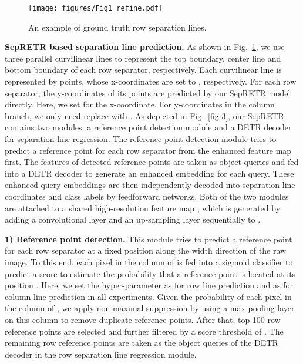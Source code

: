 \documentclass[sigconf]{acmart}
\begin{document}
\begin{figure}
  \centering
  \texttt{[image: figures/Fig1\_refine.pdf]}
  \caption{ An example of ground truth row separation lines.
  }
\label{fig-1}
\end{figure}

\textbf{SepRETR based separation line prediction.} As shown in Fig.~\ref{fig-1}, we use three parallel curvilinear lines to represent the top boundary, center line and bottom boundary of each row separator, respectively. Each curvilinear line is represented by  points, whose x-coordinates are set to , respectively. For each row separator, the y-coordinates of its  points are predicted by our SepRETR model directly. Here, we set  for the  x-coordinate. For y-coordinates in the column branch, we only need replace  with . As depicted in Fig.~\ref{fig-3}, our SepRETR contains two modules: a reference point detection module and a DETR decoder for separation line regression. The reference point detection module tries to predict a reference point for each row separator from the enhanced feature map  first. The features of detected reference points are taken as object queries and fed into a DETR decoder to generate an enhanced embedding for each query. These enhanced query embeddings are then independently decoded into separation line coordinates and class labels by feedforward networks. Both of the two modules are attached to a shared high-resolution feature map , which is generated by adding a  convolutional layer and an up-sampling layer sequentially to .

\textbf{1) Reference point detection.} This module tries to predict a reference point for each row separator at a fixed position  along the width direction of the raw image. To this end, each pixel in the  column of  is fed into a sigmoid classifier to predict a score  to estimate the probability that a reference point is located at its position . Here, we set the hyper-parameter  as  for row line prediction and  as  for column line prediction in all experiments. Given the probability of each pixel in the  column of , we apply non-maximal suppression by using a  max-pooling layer on this column to remove duplicate reference points. After that, top-100 row reference points are selected and further filtered by a score threshold of . The remaining row reference points are taken as the object queries of the DETR decoder in the row separation line regression module.
\end{document}
